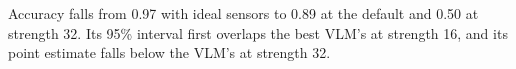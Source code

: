Accuracy falls from 0.97 with ideal sensors to 0.89 at the default and 0.50 at strength 32. Its 95\% interval first overlaps the best VLM's at strength 16, and its point estimate falls below the VLM's at strength 32.
